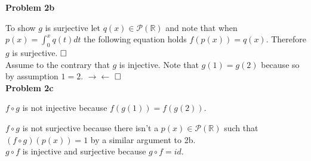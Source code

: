 \documentclass{article}
\newcommand{\problem}[1]{\large\textbf{Problem #1}\normalsize}
\newcommand{\qed}{\hfill\ensuremath{\square}}
\begin{document}
\problem{2b}

To show $g$ is surjective let $q(x) \in \mathcal{P}(\mathbb{R})$ and note that
when $p(x) = \int_0^xq(t)dt$ the following equation holds $f(p(x)) = q(x)$.
Therefore $g$ is surjective. $\qed$ \\

Assume to the contrary that $g$ is injective. Note that $g(1) = g(2)$ because
so by assumption $1 = 2$. $\rightarrow\leftarrow$ $\qed$ \\

\problem{2c}

$f \circ g$ is not injective because $f(g(1)) = f(g(2))$.

$f \circ g$ is not surjective because there isn't a
$p(x) \in \mathcal{P}(\mathbb{R})$ such that
$(f \circ g)(p(x)) = 1$ by a similar argument to 2b. \\

$g \circ f$ is injective and surjective because $g \circ f = id$.
\end{document}
